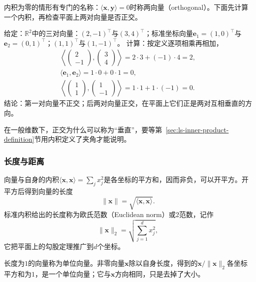 内积为零的情形有专门的名称：$\langle\bm x,\bm y\rangle=0$时称两向量（orthogonal）。下面先计算一个内积，再检查平面上两对向量是否正交。
\begin{example}[内积与正交的计算]
\label{ex:ls-inner-product-orthogonality}
给定：$\mathbb R^2$中的三对向量：$(2,-1)^\top$与$(3,4)^\top$；标准坐标向量$\bm e_1=(1,0)^\top$与$\bm e_2=(0,1)^\top$；$(1,1)^\top$与$(1,-1)^\top$。
计算：按定义逐项相乘再相加，
\[
 \begin{gathered}
 \left\langle\begin{pmatrix}2\\-1\end{pmatrix},\begin{pmatrix}3\\4\end{pmatrix}\right\rangle=2\cdot3+(-1)\cdot4=2,\\
 \langle\bm e_1,\bm e_2\rangle=1\cdot0+0\cdot1=0,\\
 \left\langle\begin{pmatrix}1\\1\end{pmatrix},\begin{pmatrix}1\\-1\end{pmatrix}\right\rangle=1\cdot1+1\cdot(-1)=0.
 \end{gathered}
\]
结论：第一对向量不正交；后两对向量正交，在平面上它们正是两对互相垂直的方向。
\end{example}
在一般维数下，正交为什么可以称为“垂直”，要等第~\ref{sec:ls-inner-product-definition}节用内积定义了夹角才能说明。

\subsubsection{长度与距离}
\label{sec:linear-algebra-length-angle-distance}

向量与自身的内积$\langle\bm x,\bm x\rangle=\sum_jx_j^2$是各坐标的平方和，因而非负，可以开平方。开平方后得到向量的长度
\begin{equation}
 \lVert\bm x\rVert=\sqrt{\langle\bm x,\bm x\rangle}.
 \label{eq:linear-algebra-inner-product-norm}
\end{equation}
标准内积给出的长度称为欧氏范数（Euclidean norm）或$2$范数，记作
\[
 \lVert\bm x\rVert_2=\sqrt{\sum_{j=1}^d x_j^2},
\]
它把平面上的勾股定理推广到$d$个坐标。

长度为$1$的向量称为单位向量。非零向量$\bm x$除以自身长度，得到的$\bm x/\lVert\bm x\rVert_2$各坐标平方和为$1$，是一个单位向量；它与$\bm x$方向相同，只是去掉了大小。

